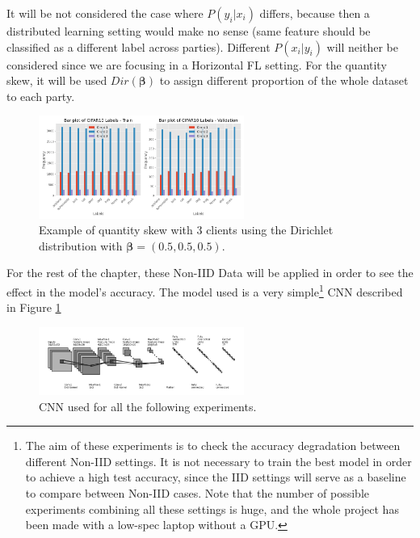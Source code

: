It will be not considered the case where $P(y_i | x_i)$ differs, because then a distributed learning setting would make no sense (same feature should be classified as a different label across parties). Different $P(x_i | y_i)$ will neither be considered since we are focusing in a Horizontal FL setting. For the quantity skew, it will be used $Dir(\boldsymbol{\beta})$ to assign different proportion of the whole dataset to each party.

\begin{figure}[H]
  \centering
  \includegraphics[width=0.6\textwidth]{figures/2-Federated_Learning/Example_Quantity_skew_3_clients.png}
  \caption{Example of quantity skew with 3 clients using the Dirichlet distribution with $\boldsymbol{\beta}=(0.5, 0.5, 0.5)$.}
\end{figure}

For the rest of the chapter, these Non-IID Data will be applied in order to see the effect in the model's accuracy. The model used is a very simple\footnote{The aim of these experiments is to check the accuracy degradation between different Non-IID settings. It is not necessary to train the best model in order to achieve a high test accuracy, since the IID settings will serve as a baseline to compare between Non-IID cases. Note that the number of possible experiments combining all these settings is huge, and the whole project has been made with a low-spec laptop without a GPU.} CNN described in Figure \ref{fig:CNN_used}

\begin{figure}[H]
  \centering
  \includegraphics[width=0.6\textwidth]{figures/2-Federated_Learning/convnet_model.png}
  \caption{CNN used for all the following experiments.}
  \label{fig:CNN_used}
\end{figure}



